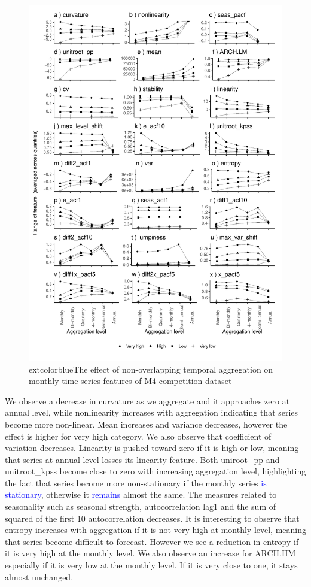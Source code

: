 \documentclass[preprint, 3p,
authoryear]{elsarticle} %
\begin{document}
\begin{figure}[H]

{\centering \includegraphics[width=0.7\linewidth]{img/300dpi/mp_category_all1} 

}

\caption{   extcolor{blue}{The effect of non-overlapping temporal aggregation on monthly time series features of M4 competition dataset} }\label{fig:featureagg1}
\end{figure}

We observe a decrease in curvature as we aggregate and it approaches
zero at annual level, while nonlinearity increases with aggregation
indicating that series become more non-linear. Mean increases and
variance decreases, however the effect is higher for very high category.
We also observe that coefficient of variation decreases. Linearity is
pushed toward zero if it is high or low, meaning that series at annual
level losses its linearity feature. Both uniroot\_pp and unitroot\_kpss
become close to zero with increasing aggregation level, highlighting the
fact that series become more non-stationary if the monthly series
\textcolor{blue}{is stationary}, otherwise it \textcolor{blue}{remains}
almost the same. The measures related to seasonality such as seasonal
strength, autocorrelation lag1 and the sum of squared of the first 10
autocorrelation decreases. It is interesting to observe that entropy
increases with aggregation if it is not very high at monthly level,
meaning that series become difficult to forecast. However we see a
reduction in entropy if it is very high at the monthly level. We also
observe an increase for ARCH.HM especially if it is very low at the
monthly level. If it is very close to one, it stays almost unchanged.
\end{document}

